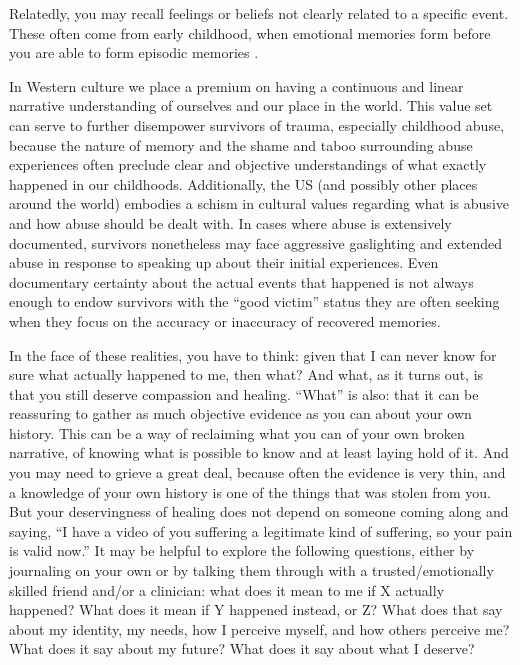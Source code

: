 \documentclass[12pt,letterpaper]{article}
\begin{document}
Relatedly, you may recall feelings or beliefs not clearly related to a specific event. These often come from early childhood, when emotional memories form before you are able to form episodic memories \cite{brownAttachmentDisturbances}.

In Western  culture we place a premium on having a continuous and linear narrative understanding of ourselves and our place in the world. This value set can serve to further disempower survivors of trauma, especially childhood abuse, because the nature of memory and the shame and taboo surrounding abuse experiences often preclude clear and objective understandings of what exactly happened in our childhoods.  Additionally, the US (and possibly other places around the world) embodies a schism in cultural values regarding what is abusive and how abuse should be dealt with. In cases where abuse is extensively documented, survivors nonetheless may face aggressive gaslighting and extended abuse in response to speaking up about their initial experiences. Even documentary certainty about the actual events that happened is not always enough to endow survivors with the “good victim” status they are often seeking when they focus on the accuracy or inaccuracy of recovered memories.

In the face of these realities, you have to think: given that I can never know for sure what actually happened to me, then what?  And what, as it turns out, is that you still deserve compassion and healing.  “What” is also: that it can be reassuring to gather as much objective evidence as you can about your own history. This can be a way of reclaiming what you can of your own broken narrative, of knowing what is possible to know and at least laying hold of it. And you may need to grieve a great deal, because often the evidence is very thin, and a knowledge of your own history is one of the things that was stolen from you. But your deservingness of healing does not depend on someone coming along and saying, “I have a video of you suffering a legitimate kind of suffering, so your pain is valid now.” It may be helpful to explore the following questions, either by journaling on your own or by talking them through with a trusted/emotionally skilled friend and/or a clinician: what does it mean to me if X actually happened? What does it mean if Y happened instead, or Z? What does that say about my identity, my needs, how I perceive myself, and how others perceive me? What does it say about my future? What does it say about what I deserve?
\end{document}
